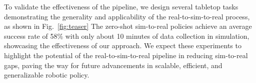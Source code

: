 To validate the effectiveness of the pipeline, we design several tabletop tasks demonstrating the generality and applicability of the real-to-sim-to-real process, as shown in Fig.~\ref{fig:teaser} The zero-shot sim-to-real policies achieve an average success rate of 58\% with only about 10 minutes of data collection in simulation, showcasing the effectiveness of our approach. We expect these experiments to highlight the potential of the real-to-sim-to-real pipeline in reducing sim-to-real gaps, paving the way for future advancements in scalable, efficient, and generalizable robotic policy.

